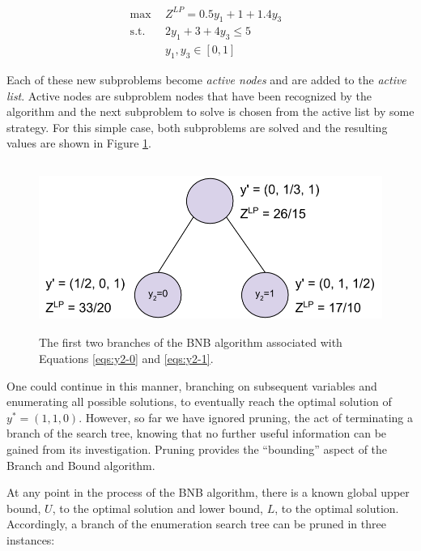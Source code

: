 \begin{subequations}\label{eqs:y2-1}
  \begin{align}
    \max \:\: & 
    Z^{LP} = 0.5 y_1 + 1 + 1.4 y_3
    & \\
    \text{s.t.} \:\: &
    2 y_1 + 3 + 4 y_3 \leq 5 
    & \\
    &
    y_1, y_3 \in [0, 1]
  \end{align}
\end{subequations}

Each of these new subproblems become \textit{active nodes} and are added to
the \textit{active list}. Active nodes are subproblem nodes that have been
recognized by the algorithm and the next subproblem to solve is chosen from the
active list by some strategy. For this simple case, both subproblems are solved
and the resulting values are shown in Figure \ref{fig:branch}.

\begin{figure}[H]
  \begin{center}
    \includegraphics[height=5.5cm]{./chapters/litreview/branch.png}
  \caption{The first two branches of the BNB algorithm associated with 
  Equations \ref{eqs:y2-0} and \ref{eqs:y2-1}.}
  \label{fig:branch}
  \end{center}
\end{figure}

One could continue in this manner, branching on subsequent variables and
enumerating all possible solutions, to eventually reach the optimal solution of
$y^* = (1, 1, 0)$. However, so far we have ignored pruning, the act of
terminating a branch of the search tree, knowing that no further useful
information can be gained from its investigation. Pruning provides the
``bounding'' aspect of the Branch and Bound algorithm.

At any point in the process of the BNB algorithm, there is a known global upper
bound, $U$, to the optimal solution and lower bound, $L$, to the optimal
solution. Accordingly, a branch of the enumeration search tree can be pruned in
three instances:

